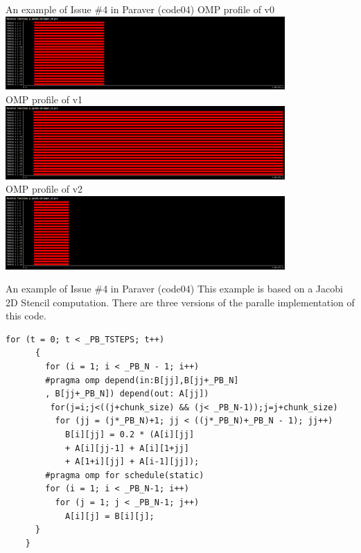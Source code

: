 \documentclass[10pt,xcolor=table]{beamer}
\begin{document}
\begin{frame}{An example of Issue \#4 in Paraver (code04)}
\centering
OMP profile of v0\\
\includegraphics[width=0.8\textwidth]{figs/Parallel_functions@jacobi-2d-imper_v0.png}\\
OMP profile of v1\\
\includegraphics[width=0.8\textwidth]{figs/Parallel_functions@jacobi-2d-imper_v1.png}\\
OMP profile of v2\\
\includegraphics[width=0.8\textwidth]{figs/Parallel_functions@jacobi-2d-imper_v2.png}\\
\end{frame}
\begin{frame}[fragile]{An example of Issue \#4 in Paraver (code04)}
This example is based on a Jacobi 2D Stencil computation. There are three versions of the paralle implementation of this code. 
\begin{lstlisting}[style=shell,basicstyle=\scriptsize\ttfamily,gobble=3,caption={Parallelized with tasks (v2)}]
      for (t = 0; t < _PB_TSTEPS; t++)
      {
        for (i = 1; i < _PB_N - 1; i++)
        #pragma omp depend(in:B[jj],B[jj+_PB_N]
        , B[jj+_PB_N]) depend(out: A[jj])
         for(j=i;j<((j+chunk_size) && (j< _PB_N-1));j=j+chunk_size)
          for (jj = (j*_PB_N)+1; jj < ((j*_PB_N)+_PB_N - 1); jj++)
            B[i][jj] = 0.2 * (A[i][jj] 
            + A[i][jj-1] + A[i][1+jj] 
            + A[1+i][jj] + A[i-1][jj]);
        #pragma omp for schedule(static) 
        for (i = 1; i < _PB_N-1; i++)
          for (j = 1; j < _PB_N-1; j++)
            A[i][j] = B[i][j];
      }
    }

  \end{lstlisting}

\end{frame}
\end{document}
